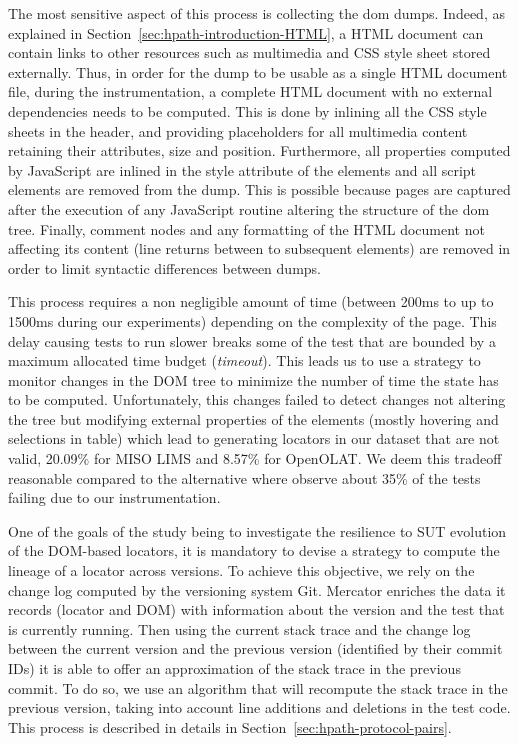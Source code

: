 The most sensitive aspect of this process is collecting the \gls{dom} dumps. Indeed, as explained in Section~\ref{sec:hpath-introduction-HTML}, a HTML document can contain links to other resources such as multimedia and CSS style sheet stored externally. Thus, in order for the dump to be usable as a single HTML document file, during the instrumentation, a complete HTML document with no external dependencies needs to be computed. This is done by inlining all the CSS style sheets in the header, and providing placeholders for all multimedia content retaining their attributes, size and position. Furthermore, all properties computed by JavaScript are inlined in the style attribute of the elements and all script elements are removed from the dump. This is possible because pages are captured after the execution of any JavaScript routine altering the structure of the \gls{dom} tree. Finally, comment nodes and any formatting of the HTML document not affecting its content (line returns between to subsequent elements) are removed in order to limit syntactic differences between dumps.

This process requires a non negligible amount of time (between 200ms to up to 1500ms during our experiments) depending on the complexity of the page. This delay causing tests to run slower breaks some of the test that are bounded by a maximum allocated time budget (\emph{timeout}). This leads us to use a strategy to monitor changes in the DOM tree to minimize the number of time the state has to be computed. Unfortunately, this changes failed to detect changes not altering the tree but modifying external properties of the elements (mostly hovering and selections in table) which lead to generating locators in our dataset that are not valid, 20.09\% for MISO LIMS and 8.57\% for OpenOLAT. We deem this tradeoff reasonable compared to the alternative where observe about 35\% of the tests failing due to our instrumentation.

One of the goals of the study being to investigate the resilience to SUT evolution of the DOM-based locators, it is mandatory to devise a strategy to compute the lineage of a locator across versions. To achieve this objective, we rely on the change log computed by the versioning system Git. Mercator enriches the data it records (locator and DOM) with information about the version and the test that is currently running. Then using the current stack trace and the change log between the current version and the previous version (identified by their commit IDs) it is able to offer an approximation of the stack trace in the previous commit. To do so, we use an algorithm that will recompute the stack trace in the previous version, taking into account line additions and deletions in the test code. This process is described in details in Section~\ref{sec:hpath-protocol-pairs}.

